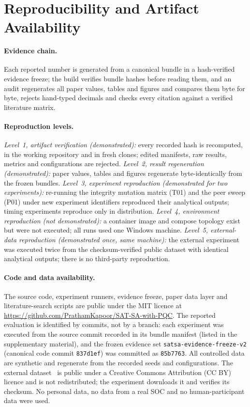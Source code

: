 \section{Reproducibility and Artifact Availability}
\label{sec:repro}

\paragraph{Evidence chain.} Each reported number is generated from a canonical bundle
in a hash-verified evidence freeze; the build verifies bundle hashes before reading
them, and an audit regenerates all paper values, tables and figures and compares them
byte for byte, rejects hand-typed decimals and checks every citation against a
verified literature matrix.

\paragraph{Reproduction levels.}
\emph{Level~1, artifact verification (demonstrated):} every recorded hash is recomputed,
in the working repository and in fresh clones; edited manifests, raw results, metrics
and configurations are rejected. \emph{Level~2, result regeneration (demonstrated):}
paper values, tables and figures regenerate byte-identically from the frozen bundles.
\emph{Level~3, experiment reproduction (demonstrated for two experiments):} re-running
the integrity mutation matrix (T01) and the peer sweep (P01) under new experiment
identifiers reproduced their analytical outputs; timing experiments reproduce only in
distribution. \emph{Level~4, environment reproduction (not demonstrated):} a container
image and compose topology exist but were not executed; all runs used one Windows
machine. \emph{Level~5, external-data reproduction (demonstrated once, same machine):}
the external experiment was executed twice from the checksum-verified public dataset
with identical analytical outputs; there is no third-party reproduction.

\paragraph{Code and data availability.} The source code, experiment runners, evidence
freeze, paper data layer and literature-search scripts are public under the MIT licence
at \url{https://github.com/PrathamKapoor/SAT-SA-with-PQC}. The reported evaluation is
identified by commits, not by a branch: each experiment was executed from the source
commit recorded in its bundle manifest (listed in the supplementary material), and the
frozen evidence set \texttt{satsa-evidence-freeze-v2} (canonical code commit
\texttt{837d1ef}) was committed as \texttt{85b7763}. All controlled data
are synthetic and regenerate from the recorded seeds and configurations. The external
dataset~\cite{amaral2018uci498} is public under a Creative Commons Attribution (CC BY) licence and is not
redistributed; the
experiment downloads it and verifies its checksum. No personal data, no data from a
real SOC and no human-participant data were used.
